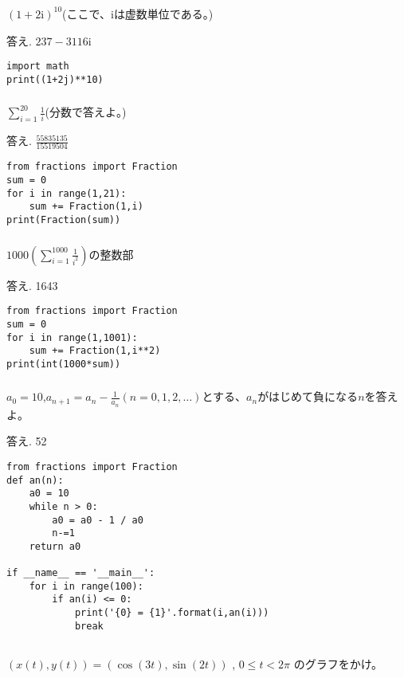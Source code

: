 \documentclass[12pt,a4paper]{jsarticle}
\begin{document}
\subsubsection{}
$(1+2\mathrm{i})^{10}$(ここで、$\mathrm{i}$は虚数単位である。)\par
答え. $237-3116\mathrm{i}$
\begin{lstlisting}
import math
print((1+2j)**10)
\end{lstlisting}
\subsubsection{}
$\displaystyle\sum_{i=1}^{20} \frac{1}{i}$(分数で答えよ。)\par
答え. $\displaystyle\frac{55835135}{15519504}$\\
\begin{lstlisting}
from fractions import Fraction
sum = 0
for i in range(1,21):
    sum += Fraction(1,i)
print(Fraction(sum))
\end{lstlisting}
\subsubsection{}
$\displaystyle1000(\sum_{i=1}^{1000} \frac{1}{i^{2}})$の整数部\par
答え. 1643
\begin{lstlisting}
from fractions import Fraction
sum = 0
for i in range(1,1001):
    sum += Fraction(1,i**2)
print(int(1000*sum))
\end{lstlisting}
\subsubsection{}
$a_0 = 10$,$\displaystyle a_{n+1} = a_n - \frac{1}{a_n}$$(n=0,1,2,\dots)$とする、$a_n$がはじめて負になる$n$を答えよ。\par
答え. 52
\begin{lstlisting}
from fractions import Fraction
def an(n):
    a0 = 10
    while n > 0:
        a0 = a0 - 1 / a0
        n-=1
    return a0

if __name__ == '__main__':
    for i in range(100):
        if an(i) <= 0:
            print('{0} = {1}'.format(i,an(i)))
            break
\end{lstlisting}

\subsection{}
$(x(t),y(t)) = (\cos(3t),\sin(2t))$ , $0 \leq t < 2 \pi$ のグラフをかけ。
\end{document}
